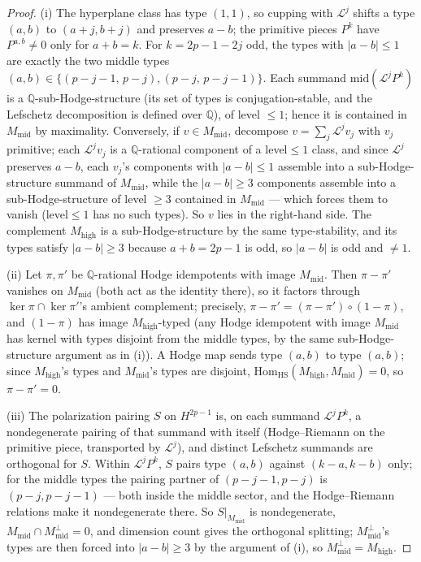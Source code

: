 \documentclass[11pt]{article}
\newcommand{\Q}{\mathbb{Q}}
\newcommand{\Hom}{\mathrm{Hom}}
\begin{document}
\begin{proof}
(i) The hyperplane class has type $(1,1)$, so cupping with
$\mathcal L^{j}$ shifts a type $(a,b)$ to $(a+j,b+j)$ and preserves
$a-b$; the primitive pieces $P^{k}$ have $P^{a,b}\ne0$ only for $a+b=k$.
For $k=2p-1-2j$ odd, the types with $|a-b|\le1$ are exactly the two middle
types $(a,b)\in\{(p-j-1,\,p-j),(p-j,\,p-j-1)\}$. Each summand
$\mathrm{mid}(\mathcal L^{j}P^{k})$ is a $\Q$-sub-Hodge-structure (its set of
types is conjugation-stable, and the Lefschetz decomposition is defined over
$\Q$), of level $\le1$; hence it is contained in $M_{\mathrm{mid}}$ by
maximality. Conversely, if $v\in M_{\mathrm{mid}}$, decompose
$v=\sum_j\mathcal L^{j}v_j$ with $v_j$ primitive; each
$\mathcal L^{j}v_j$ is a $\Q$-rational component of a level${}\le{}1$
class, and since $\mathcal L^{j}$ preserves $a-b$, each $v_j$'s components
with $|a-b|\le1$ assemble into a sub-Hodge-structure summand of
$M_{\mathrm{mid}}$, while the $|a-b|\ge3$ components assemble into a
sub-Hodge-structure of level $\ge3$ contained in $M_{\mathrm{mid}}$ --- which
forces them to vanish (level${}\le1$ has no such types). So $v$ lies in the
right-hand side. The complement $M_{\mathrm{high}}$ is a sub-Hodge-structure
by the same type-stability, and its types satisfy $|a-b|\ge3$ because
$a+b=2p-1$ is odd, so $|a-b|$ is odd and $\ne1$.

(ii) Let $\pi,\pi'$ be $\Q$-rational Hodge idempotents with image
$M_{\mathrm{mid}}$. Then $\pi-\pi'$ vanishes on $M_{\mathrm{mid}}$ (both act
as the identity there), so it factors through
$\ker\pi\cap\ker\pi'$'s ambient complement; precisely,
$\pi-\pi'=(\pi-\pi')\circ(1-\pi)$, and $(1-\pi)$ has image
$M_{\mathrm{high}}$-typed (any Hodge idempotent with image $M_{\mathrm{mid}}$
has kernel with types disjoint from the middle types, by the same
sub-Hodge-structure argument as in (i)). A Hodge map sends type $(a,b)$ to
type $(a,b)$; since $M_{\mathrm{high}}$'s types and $M_{\mathrm{mid}}$'s
types are disjoint, $\Hom_{\mathrm{HS}}(M_{\mathrm{high}},M_{\mathrm{mid}})=0$,
so $\pi-\pi'=0$.

(iii) The polarization pairing $S$ on $H^{2p-1}$ is, on each summand
$\mathcal L^{j}P^{k}$, a nondegenerate pairing of that summand with itself
(Hodge--Riemann on the primitive piece, transported by
$\mathcal L^{j}$), and distinct Lefschetz summands are orthogonal for $S$.
Within $\mathcal L^{j}P^{k}$, $S$ pairs type $(a,b)$ against
$(k-a,k-b)$ only; for the middle types the pairing partner of
$(p-j-1,p-j)$ is $(p-j,p-j-1)$ --- both inside the middle sector, and the
Hodge--Riemann relations make it nondegenerate there. So
$S|_{M_{\mathrm{mid}}}$ is nondegenerate, $M_{\mathrm{mid}}\cap
M_{\mathrm{mid}}^{\perp}=0$, and dimension count gives the orthogonal
splitting; $M_{\mathrm{mid}}^{\perp}$'s types are then forced into
$|a-b|\ge3$ by the argument of (i), so $M_{\mathrm{mid}}^{\perp}=
M_{\mathrm{high}}$.
\end{proof}
\end{document}
